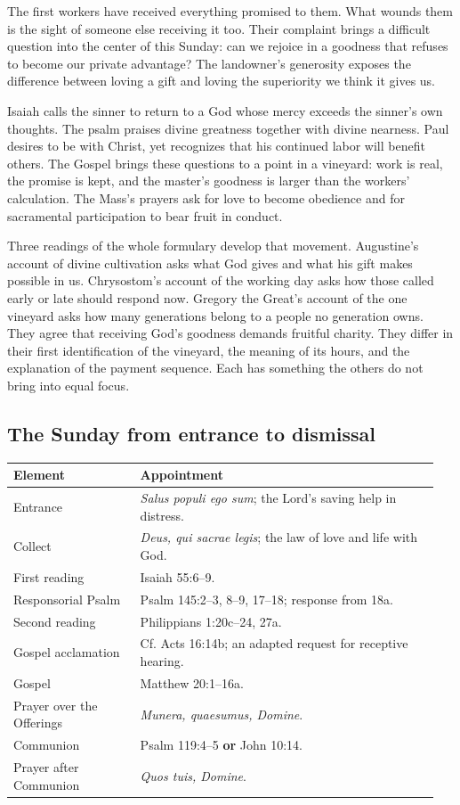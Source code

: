 The first workers have received everything promised to them. What wounds them is the sight of someone else receiving it too. Their complaint brings a difficult question into the center of this Sunday: can we rejoice in a goodness that refuses to become our private advantage? The landowner's generosity exposes the difference between loving a gift and loving the superiority we think it gives us.

Isaiah calls the sinner to return to a God whose mercy exceeds the sinner's own thoughts. The psalm praises divine greatness together with divine nearness. Paul desires to be with Christ, yet recognizes that his continued labor will benefit others. The Gospel brings these questions to a point in a vineyard: work is real, the promise is kept, and the master's goodness is larger than the workers' calculation. The Mass's prayers ask for love to become obedience and for sacramental participation to bear fruit in conduct.

Three readings of the whole formulary develop that movement. Augustine's account of divine cultivation asks what God gives and what his gift makes possible in us. Chrysostom's account of the working day asks how those called early or late should respond now. Gregory the Great's account of the one vineyard asks how many generations belong to a people no generation owns. They agree that receiving God's goodness demands fruitful charity. They differ in their first identification of the vineyard, the meaning of its hours, and the explanation of the payment sequence. Each has something the others do not bring into equal focus.

\subsection{The Sunday from entrance to dismissal}
\begin{longtable}{@{}p{0.29\linewidth}p{0.66\linewidth}@{}}
\toprule
\textbf{Element} & \textbf{Appointment}\\\midrule
Entrance & \textit{Salus populi ego sum}; the Lord's saving help in distress.\\
Collect & \textit{Deus, qui sacrae legis}; the law of love and life with God.\\
First reading & Isaiah 55:6--9.\\
Responsorial Psalm & Psalm 145:2--3, 8--9, 17--18; response from 18a.\\
Second reading & Philippians 1:20c--24, 27a.\\
Gospel acclamation & Cf. Acts 16:14b; an adapted request for receptive hearing.\\
Gospel & Matthew 20:1--16a.\\
Prayer over the Offerings & \textit{Munera, quaesumus, Domine}.\\
Communion & Psalm 119:4--5 \textbf{or} John 10:14.\\
Prayer after Communion & \textit{Quos tuis, Domine}.\\\bottomrule
\end{longtable}
